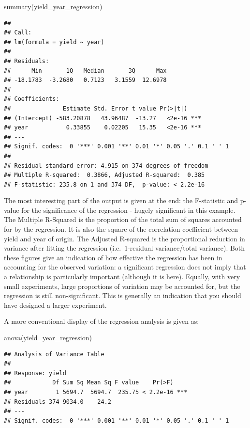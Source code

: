 \documentclass[
]{book}
\newenvironment{Shaded}{\begin{snugshade}}{\end{snugshade}}
\newcommand{\FunctionTok}[1]{\textcolor[rgb]{0.00,0.00,0.00}{#1}}
\newcommand{\NormalTok}[1]{#1}
\begin{document}
\begin{Shaded}
\begin{Highlighting}[]
\FunctionTok{summary}\NormalTok{(yield\_year\_regression)}
\end{Highlighting}
\end{Shaded}

\begin{verbatim}
## 
## Call:
## lm(formula = yield ~ year)
## 
## Residuals:
##      Min       1Q   Median       3Q      Max 
## -18.1783  -3.2680   0.7123   3.1559  12.6978 
## 
## Coefficients:
##               Estimate Std. Error t value Pr(>|t|)    
## (Intercept) -583.20878   43.96487  -13.27   <2e-16 ***
## year           0.33855    0.02205   15.35   <2e-16 ***
## ---
## Signif. codes:  0 '***' 0.001 '**' 0.01 '*' 0.05 '.' 0.1 ' ' 1
## 
## Residual standard error: 4.915 on 374 degrees of freedom
## Multiple R-squared:  0.3866, Adjusted R-squared:  0.385 
## F-statistic: 235.8 on 1 and 374 DF,  p-value: < 2.2e-16
\end{verbatim}

The most interesting part of the output is given at the end: the F-statistic and p-value for the significance of the regression - hugely significant in this example. The Multiple R-Squared is the proportion of the total sum of squares accounted for by the regression. It is also the square of the correlation coefficient between yield and year of origin. The Adjusted R-squared is the proportional reduction in variance after fitting the regression (i.e.~1-residual variance/total variance). Both these figures give an indication of how effective the regression has been in accounting for the observed variation: a significant regression does not imply that a relationship is particularly important (although it is here). Equally, with very small experiments, large proportions of variation may be accounted for, but the regression is still non-significant. This is generally an indication that you should have designed a larger experiment.

A more conventional display of the regression analysis is given as:

\begin{Shaded}
\begin{Highlighting}[]
\FunctionTok{anova}\NormalTok{(yield\_year\_regression)}
\end{Highlighting}
\end{Shaded}

\begin{verbatim}
## Analysis of Variance Table
## 
## Response: yield
##            Df Sum Sq Mean Sq F value    Pr(>F)    
## year        1 5694.7  5694.7  235.75 < 2.2e-16 ***
## Residuals 374 9034.0    24.2                      
## ---
## Signif. codes:  0 '***' 0.001 '**' 0.01 '*' 0.05 '.' 0.1 ' ' 1
\end{verbatim}
\end{document}
